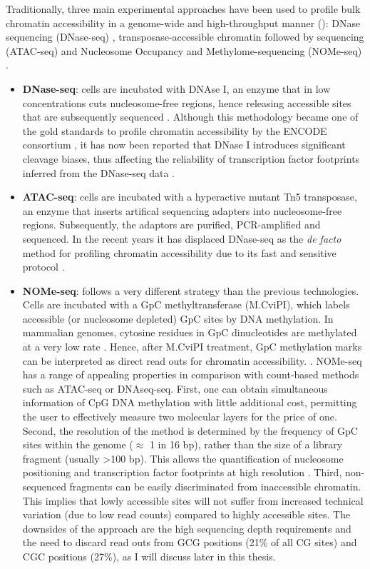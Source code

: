 Traditionally, three main experimental approaches have been used to profile bulk chromatin accessibility in a genome-wide and high-throughput manner \cite{Nordstrom2019} (): DNase sequencing (DNase-seq) \cite{Song2010}, transposase-accessible chromatin followed by sequencing (ATAC-seq) \cite{Buenrostro2013} and Nucleosome Occupancy and Methylome-sequencing (NOMe-seq) \cite{Kelly2012}.

\begin{itemize}

	\item \textbf{DNase-seq}: cells are incubated with DNAse I, an enzyme that in low concentrations cuts nucleosome-free regions, hence releasing accessible sites that are subsequently sequenced \cite{Song2010}. Although this methodology became one of the gold standards to profile chromatin accessibility by the ENCODE consortium \cite{ENCODE2012,Thurman2012}, it has now been reported that DNase I introduces significant cleavage biases, thus affecting the reliability of transcription factor footprints inferred from the DNase-seq data \cite{He2013}.

	\item \textbf{ATAC-seq}: cells are incubated with a hyperactive mutant Tn5 transposase, an enzyme that inserts artifical sequencing adapters into nucleosome-free regions. Subsequently, the adaptors are purified, PCR-amplified  and sequenced. In the recent years it has displaced DNase-seq as the \textit{de facto} method for profiling chromatin accessibility due to its fast and sensitive protocol \cite{Buenrostro2015b,Tsompana2014}.

	\item \textbf{NOMe-seq}: follows a very different strategy than the previous technologies. Cells are incubated with a GpC methyltransferase (M.CviPI), which labels accessible (or nucleosome depleted) GpC sites by DNA methylation. In mammalian genomes, cytosine residues in GpC dinucleotides are methylated at a very low rate \cite{Kilgore2007}. Hence, after M.CviPI treatment, GpC methylation marks can be interpreted as direct read outs for chromatin accessibility. \cite{Kelly2012}. NOMe-seq has a range of appealing properties in comparison with count-based methods such as ATAC-seq or DNAseq-seq. First, one can obtain simultaneous information of CpG DNA methylation with little additional cost, permitting the user to effectively measure two molecular layers for the price of one. Second, the resolution of the method is determined by the frequency of GpC sites within the genome ($\approx$ 1 in 16 bp), rather than the size of a library fragment (usually >100 bp). This allows the quantification of nucleosome positioning and transcription factor footprints at high resolution \cite{Kelly2012,Pott2016}. Third, non-sequenced fragments can be easily discriminated from inaccessible chromatin. This implies that lowly accessible sites will not suffer from increased technical variation (due to low read counts) compared to highly accessible sites. The downsides of the approach are the high sequencing depth requirements and the need to discard read outs from GCG positions (21\% of all CG sites) and CGC positions (27\%), as I will discuss later in this thesis.


\end{itemize}
